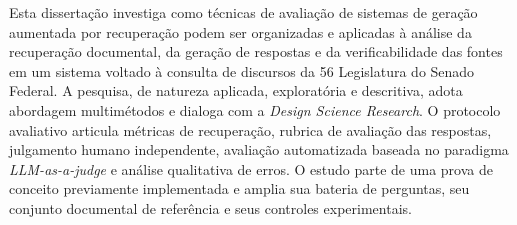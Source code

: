 \begin{resumo}
Esta dissertação investiga como técnicas de avaliação de sistemas de geração aumentada por recuperação podem ser organizadas e aplicadas à análise da recuperação documental, da geração de respostas e da verificabilidade das fontes em um sistema voltado à consulta de discursos da 56\textordfeminine{} Legislatura do Senado Federal. A pesquisa, de natureza aplicada, exploratória e descritiva, adota abordagem multimétodos e dialoga com a \textit{Design Science Research}. O protocolo avaliativo articula métricas de recuperação, rubrica de avaliação das respostas, julgamento humano independente, avaliação automatizada baseada no paradigma \textit{LLM-as-a-judge} e análise qualitativa de erros. O estudo parte de uma prova de conceito previamente implementada e amplia sua bateria de perguntas, seu conjunto documental de referência e seus controles experimentais. %
\end{resumo}
